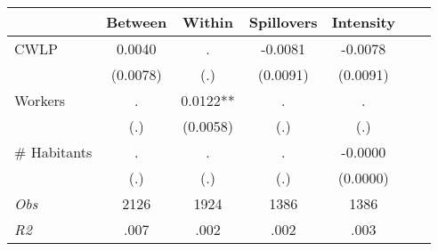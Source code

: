 \begin{tabular}{l*{6}{c}}\hline&\multicolumn{1}{c}{Between}&\multicolumn{1}{c}{Within}&\multicolumn{1}{c}{Spillovers}&\multicolumn{1}{c}{Intensity}\\ \hline 
CWLP & 0.0040 & . & -0.0081 & -0.0078 \\
 & (0.0078) & (.) & (0.0091) & (0.0091) \\
Workers & . & 0.0122** & . & . \\
 & (.) & (0.0058) & (.) & (.) \\
\# Habitants & . & . & . & -0.0000 \\
  & (.) & (.) & (.) & (0.0000) \\
\hline \textit{Obs} & 2126 & 1924 & 1386 & 1386  \\ \textit{R2} & .007 & .002 & .002 & .003 \\ \hline \end{tabular}
